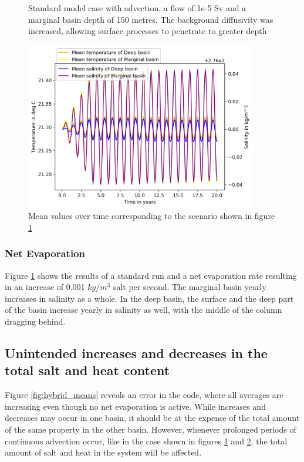 \documentclass[twocolumn]{article}
\begin{document}
\begin{figure}
\begin{subfigure}[h]{0.20\textwidth}
\end{subfigure}\hfill
\caption{Standard model case with advection, a flow of 1e-5 Sv and a marginal basin depth of 150 metres. The background diffusivity was increased, allowing surface processes to penetrate to greater depth}
\label{fig:high_db_success}
\end{figure}

\begin{figure}
\centering
\includegraphics[width=0.9\textwidth,keepaspectratio]{high_bg_diff_kleine_uitslag_mean_values.png}
\caption{Mean values over time corresponding to the scenario shown in figure \ref{fig:high_db_success}}
\label{fig:high_bg_diff_means}
\end{figure}\hfill


\subsubsection{Net Evaporation}
Figure \ref{fig:high_db_success} shows the results of a standard run and a net evaporation rate resulting in an increase of 0.001 $kg/m^3$ salt per second. The marginal basin yearly increases in salinity as a whole. In the deep basin, the surface and the deep part of the basin increase yearly in salinity as well, with the middle of the column dragging behind.

\subsection{Unintended increases and decreases in the total salt and heat content}
\label{sect:totals_problem}
Figure \ref{fig:hybrid_means} reveals an error in the code, where all averages are increasing even though no net evaporation is active. While increases and decreases may occur in one basin, it should be at the expense of the total amount of the same property in the other basin. However, whenever prolonged periods of continuous advection occur, like in the case shown in figures \ref{fig:high_db_success} and \ref{fig:high_bg_diff_means}, the total amount of salt and heat in the system will be affected.
\end{document}
